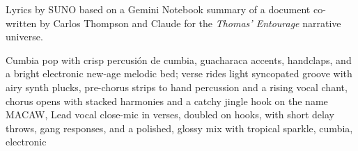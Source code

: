 
\begin{notes}
Lyrics by SUNO based on a Gemini Notebook summary of a document co-written by Carlos Thompson and Claude for the \emph{Thomas’ Entourage} narrative universe.
\end{notes}
\begin{style}
Cumbia pop with crisp percusión de cumbia, guacharaca accents, handclaps, and a bright electronic new-age melodic bed; verse rides light syncopated groove with airy synth plucks, pre-chorus strips to hand percussion and a rising vocal chant, chorus opens with stacked harmonies and a catchy jingle hook on the name MACAW, Lead vocal close-mic in verses, doubled on hooks, with short delay throws, gang responses, and a polished, glossy mix with tropical sparkle, cumbia, electronic
\end{style}
